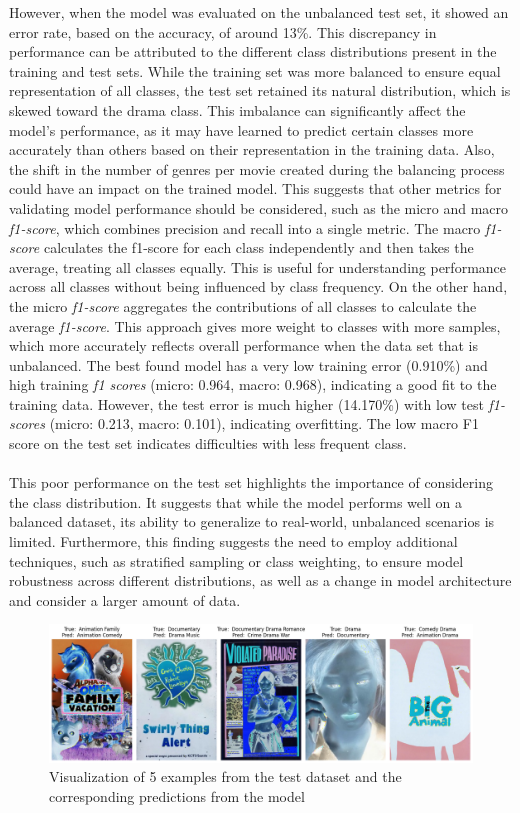 \documentclass[a4paper, 11pt]{article}
\begin{document}
    However, when the model was evaluated on the unbalanced test set, it showed an error rate, based on the accuracy, of around 13\%. This discrepancy in performance can be attributed to the different class distributions present in the training and test sets. While the training set was more balanced to ensure equal representation of all classes, the test set retained its natural distribution, which is skewed toward the drama class. This imbalance can significantly affect the model's performance, as it may have learned to predict certain classes more accurately than others based on their representation in the training data. Also, the shift in the number of genres per movie created during the balancing process could have an impact on the trained model. This suggests that other metrics for validating model performance should be considered, such as the micro and macro \textit{f1-score}, which combines precision and recall into a single metric. The macro \textit{f1-score} calculates the f1-score for each class independently and then takes the average, treating all classes equally. This is useful for understanding performance across all classes without being influenced by class frequency. On the other hand, the micro \textit{f1-score} aggregates the contributions of all classes to calculate the average \textit{f1-score}. This approach gives more weight to classes with more samples, which more accurately reflects overall performance when the data set that is unbalanced. The best found model has a very low training error (0.910\%) and high training \textit{f1 scores} (micro: 0.964, macro: 0.968), indicating a good fit to the training data. However, the test error is much higher (14.170\%) with low test \textit{f1-scores} (micro: 0.213, macro: 0.101), indicating overfitting. The low macro F1 score on the test set indicates difficulties with less frequent class.\\\\
    This poor performance on the test set highlights the importance of considering the class distribution. It suggests that while the model performs well on a balanced dataset, its ability to generalize to real-world, unbalanced scenarios is limited. Furthermore, this finding suggests the need to employ additional techniques, such as stratified sampling or class weighting, to ensure model robustness across different distributions, as well as a change in model architecture and consider a larger amount of data.
    \begin{figure}[h!]
        \includegraphics[width=\linewidth]{imgs/prediction_visualisation.png}
        \caption{Visualization of 5 examples from the test dataset and the corresponding predictions from the model}
        \label{fig:visualisationPrediction}
    \end{figure}\\
\end{document}
